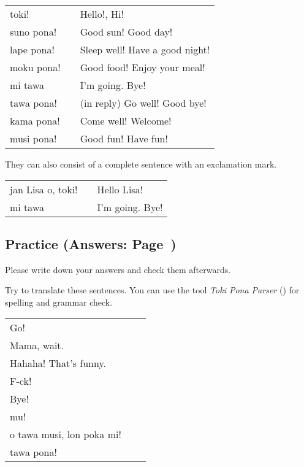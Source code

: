 \begin{supertabular}{p{5,5cm}|ll}
toki! && Hello!, Hi! \\
suno pona! && Good sun! Good day! \\
lape pona! && Sleep well! Have a good night! \\
moku pona! && Good food! Enjoy your meal! \\
mi tawa && I'm going. Bye! \\
tawa pona! && (in reply) Go well! Good bye! \\
kama pona! && Come well! Welcome! \\
musi pona! && Good fun! Have fun! \\
\end{supertabular}  

They can also consist of a complete sentence with an exclamation mark.

\begin{supertabular}{p{5,5cm}|ll}
jan Lisa o, toki! && Hello Lisa! \\
mi tawa && I'm going. Bye! \\
\end{supertabular}
%
\newpage
\subsection*{Practice (Answers: Page~\pageref{'commands_interjections'})}
%
Please write down your answers and check them afterwards. 



Try to translate these sentences. 
You can use the tool \textit{Toki Pona Parser} (\cite{www:rowa:02}) for spelling and grammar check. 

\begin{supertabular}{p{5,5cm}|ll}
Go!  &&  \\ %
Mama, wait.  &&  \\ %
Hahaha! That's funny.  &&  \\ %
F-ck! &&  \\ %
Bye!  &&  \\ %
mu!  &&  \\ %
o tawa musi, lon poka mi!  &&  \\ %
tawa pona!  &&  \\ %
\end{supertabular} 

%
